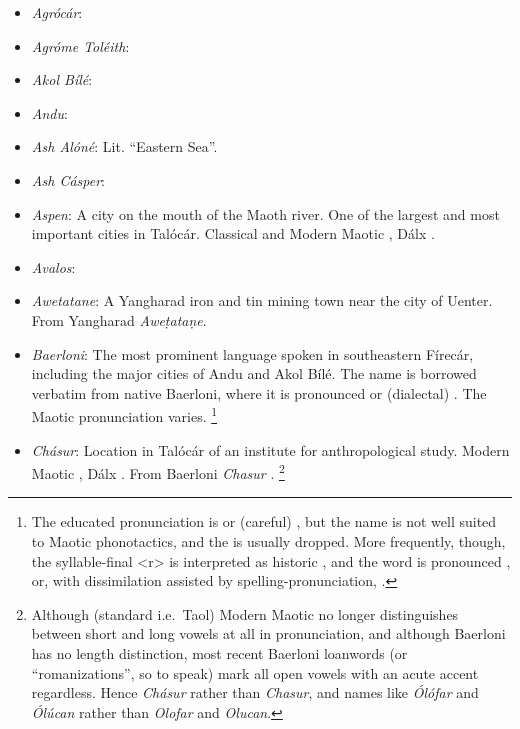 \documentclass{article}
\let\oldthefootnote\thefootnote
\newcommand\oocfootnote[2][DarkGreen]{\renewcommand\thefootnote{\color{#1}\oldthefootnote}%
  \footnote{\color{#1}#2}%
  \renewcommand{\thefootnote}{\oldthefootnote}}
\begin{document}
\begin{itemize}
 \item \textit{Agrócár}:

 \item \textit{Agróme Toléith}:

 \item \textit{Akol Bílé}:

 \item \textit{Andu}:

 \item \textit{Ash Alóné}: Lit. ``Eastern Sea''.

 \item \textit{Ash Cásper}:

 \item \textit{Aspen}: A city on the mouth of the Maoth river. One of the largest and most important cities in Talócár. Classical and Modern Maotic , Dálx .

 \item \textit{Avalos}:

 \item \textit{Awetatane}: A Yangharad iron and tin mining town near the city of Uenter. From Yangharad \textit{Awe\d{t}ata\d{n}e}.

 \item \textit{Baerloni}: The most prominent language spoken in southeastern Fírecár, including the major cities of Andu and Akol Bílé. The name is borrowed verbatim from native Baerloni, where it is pronounced  or (dialectal) . The Maotic pronunciation varies.\oocfootnote{The educated pronunciation is  or (careful) \textipa{/ba.er.lo.ni/}, but the name is not well suited to Maotic phonotactics, and the \textipa{/r/} is usually dropped. More frequently, though, the syllable-final <r> is interpreted as historic \textipa{/K/}, and the word is pronounced \textipa{/ba.aloni/}, or, with dissimilation assisted by spelling-pronunciation, \textipa{/ba.eloni/}.}

 \item \textit{Chásur}: Location in Talócár of an institute for anthropological study. Modern Maotic , Dálx . From Baerloni \textit{Chasur} .\oocfootnote{Although (standard i.e.\ Taol) Modern Maotic no longer distinguishes between short and long vowels at all in pronunciation, and although Baerloni has no length distinction, most recent Baerloni loanwords (or ``romanizations'', so to speak) mark all open vowels with an acute accent regardless. Hence \textit{Chásur} rather than \textit{Chasur}, and names like \textit{Ólófar} and \textit{Ólúcan} rather than \textit{Olofar} and \textit{Olucan}.}


\end{itemize}
\end{document}
